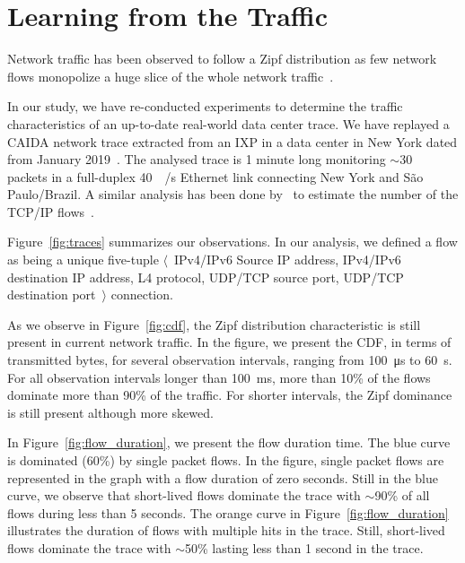 
\section{Learning from the Traffic}\label{sec:traffic}

Network traffic has been observed to follow a Zipf distribution as few network flows monopolize a huge slice of the whole network traffic~\cite{Sarrar:2012,Jin:2017}.

In our study, we have re-conducted experiments to determine the traffic characteristics of an up-to-date real-world data center trace.
We have replayed a CAIDA network trace extracted from an IXP in a data center in New York dated from January 2019~\cite{caida:19}.
The analysed trace is 1 minute long monitoring $\sim$\SI{30}{\mega\nothing} packets in a full-duplex \SI{40}{\giga\bit/\second} Ethernet link connecting New York and S\~ao Paulo/Brazil.
A similar analysis has been done by~\citeauthor{Spang:19} to estimate the number of the TCP/IP flows~\cite{Spang:19}.

Figure~\ref{fig:traces} summarizes our observations.
In our analysis, we defined a flow as being a unique five-tuple $\langle$~IPv4/IPv6 Source IP address, IPv4/IPv6 destination IP address, L4 protocol, UDP/TCP source port, UDP/TCP destination port~$\rangle$ connection.

As we observe in Figure~\ref{fig:cdf}, the Zipf distribution characteristic is still present in current network traffic.
In the figure, we present the CDF, in terms of transmitted bytes, for several observation intervals, ranging from \SI{100}{\micro\second} to \SI{60}{\second}.
For all observation intervals longer than \SI{100}{\milli\second}, more than 10\% of the flows dominate more than 90\% of the traffic.
For shorter intervals, the Zipf dominance is still present although more skewed.

In Figure~\ref{fig:flow_duration}, we present the flow duration time.
The blue curve is dominated (60\%) by single packet flows.
In the figure, single packet flows are represented in the graph with a flow duration of zero seconds.
Still in the blue curve, we observe that short-lived flows dominate the trace with $\sim$90\% of all flows during less than 5 seconds.
The orange curve in Figure~\ref{fig:flow_duration} illustrates the duration of flows with multiple hits in the trace.
Still, short-lived flows dominate the trace with $\sim$50\% lasting less than 1 second in the trace.


